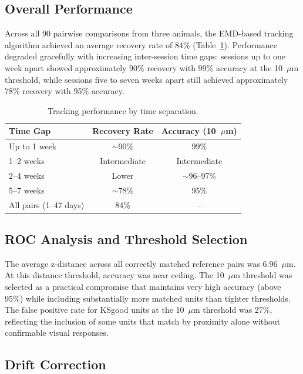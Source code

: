 \documentclass[12pt]{article}
\begin{document}
\subsection{Overall Performance}

Across all 90 pairwise comparisons from three animals, the EMD-based tracking algorithm achieved an average recovery rate of 84\% (Table~\ref{tab:performance}). Performance degraded gracefully with increasing inter-session time gaps: sessions up to one week apart showed approximately 90\% recovery with 99\% accuracy at the 10~$\mu$m threshold, while sessions five to seven weeks apart still achieved approximately 78\% recovery with 95\% accuracy.

\begin{table}[ht]
\centering
\caption{Tracking performance by time separation.}
\label{tab:performance}
\begin{tabular}{lcc}
\toprule
Time Gap & Recovery Rate & Accuracy (10~$\mu$m) \\
\midrule
Up to 1 week & $\sim$90\% & 99\% \\
1--2 weeks & Intermediate & Intermediate \\
2--4 weeks & Lower & $\sim$96--97\% \\
5--7 weeks & $\sim$78\% & 95\% \\
\midrule
All pairs (1--47 days) & 84\% & -- \\
\bottomrule
\end{tabular}
\end{table}

\subsection{ROC Analysis and Threshold Selection}

The average z-distance across all correctly matched reference pairs was 6.96~$\mu$m. At this distance threshold, accuracy was near ceiling. The 10~$\mu$m threshold was selected as a practical compromise that maintains very high accuracy (above 95\%) while including substantially more matched units than tighter thresholds. The false positive rate for KSgood units at the 10~$\mu$m threshold was 27\%, reflecting the inclusion of some units that match by proximity alone without confirmable visual responses.

\subsection{Drift Correction}
\end{document}
